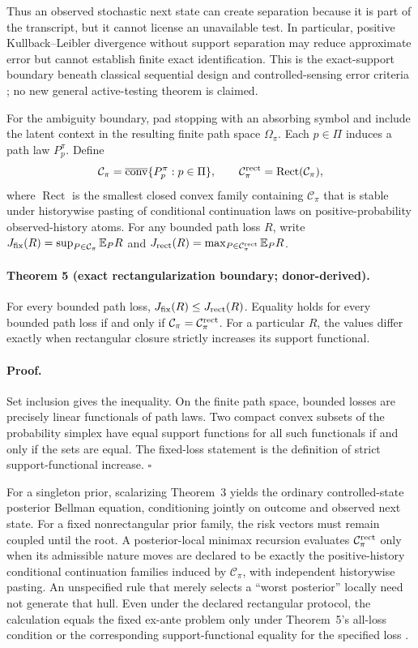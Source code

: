 Thus an observed stochastic next state can create separation because it is
part of the transcript, but it cannot license an unavailable test. In
particular, positive Kullback--Leibler divergence without support separation
may reduce approximate error but cannot establish finite exact identification.
This is the exact-support boundary beneath classical sequential design and
controlled-sensing error criteria \cite{chernoff1959}; no new general
active-testing theorem is claimed.

For the ambiguity boundary, pad stopping with an absorbing symbol and include
the latent context in the resulting finite path space $\Omega_\pi$. Each
$p\in\Pi$ induces a path law $P_p^\pi$. Define
\[
 \mathcal C_\pi=\overline{\operatorname{conv}}
   \{P_p^\pi:p\in\Pi\},
 \qquad
 \mathcal C_\pi^{\rm rect}=\operatorname{Rect}(\mathcal C_\pi),
\]
where $\operatorname{Rect}$ is the smallest closed convex family containing
$\mathcal C_\pi$ that is stable under historywise pasting of conditional
continuation laws on positive-probability observed-history atoms. For any
bounded path loss $R$, write $J_{\rm fix}(R)=\sup_{P\in\mathcal C_\pi}
\mathbb E_P R$ and $J_{\rm rect}(R)=\max_{P\in\mathcal C_\pi^{\rm rect}}
\mathbb E_P R$.

\paragraph{Theorem 5 (exact rectangularization boundary; donor-derived).}
For every bounded path loss,
$J_{\rm fix}(R)\leq J_{\rm rect}(R)$. Equality holds for every bounded path
loss if and only if
$\mathcal C_\pi=\mathcal C_\pi^{\rm rect}$. For a particular $R$, the values
differ exactly when rectangular closure strictly increases its support
functional.

\paragraph{Proof.}
Set inclusion gives the inequality. On the finite path space, bounded losses
are precisely linear functionals of path laws. Two compact convex subsets of
the probability simplex have equal support functions for all such functionals
if and only if the sets are equal. The fixed-loss statement is the definition
of strict support-functional increase. \hfill$\square$

For a singleton prior, scalarizing Theorem~3 yields the ordinary
controlled-state posterior Bellman equation, conditioning jointly on outcome
and observed next state. For a fixed nonrectangular prior family, the risk
vectors must remain coupled until the root. A posterior-local minimax recursion
evaluates $\mathcal C_\pi^{\rm rect}$ only when its admissible nature moves are
declared to be exactly the positive-history conditional continuation families
induced by $\mathcal C_\pi$, with independent historywise pasting. An
unspecified rule that merely selects a ``worst posterior'' locally need not
generate that hull. Even under the declared rectangular protocol, the
calculation equals the fixed ex-ante problem only under Theorem~5's all-loss
condition or the corresponding support-functional equality for the specified
loss \cite{epstein2003}.

